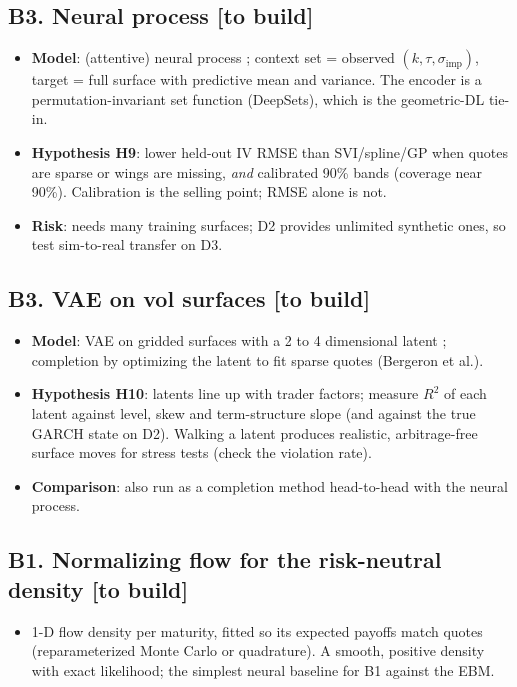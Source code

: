 \documentclass[10pt]{article}
\newcommand{\status}[1]{\textsf{\small[#1]}}
\begin{document}
\subsection{B3. Neural process \status{to build}}
\begin{itemize}
\item \textbf{Model}: (attentive) neural process \cite{np,anp}; context set = observed $(k,\tau,\sigma_{\text{imp}})$,
target = full surface with predictive mean and variance. The encoder is a permutation-invariant set function
(DeepSets), which is the geometric-DL tie-in.
\item \textbf{Hypothesis H9}: lower held-out IV RMSE than SVI/spline/GP when quotes are sparse or wings are missing,
\emph{and} calibrated 90\% bands (coverage near 90\%). Calibration is the selling point; RMSE alone is not.
\item \textbf{Risk}: needs many training surfaces; D2 provides unlimited synthetic ones, so test sim-to-real
transfer on D3.
\end{itemize}

\subsection{B3. VAE on vol surfaces \status{to build}}
\begin{itemize}
\item \textbf{Model}: VAE on gridded surfaces with a 2 to 4 dimensional latent \cite{bergeron,ning}; completion by
optimizing the latent to fit sparse quotes (Bergeron et al.).
\item \textbf{Hypothesis H10}: latents line up with trader factors; measure $R^2$ of each latent against level,
skew and term-structure slope (and against the true GARCH state on D2). Walking a latent produces realistic,
arbitrage-free surface moves for stress tests (check the violation rate).
\item \textbf{Comparison}: also run as a completion method head-to-head with the neural process.
\end{itemize}

\subsection{B1. Normalizing flow for the risk-neutral density \status{to build}}
\begin{itemize}
\item 1-D flow density per maturity, fitted so its expected payoffs match quotes (reparameterized Monte Carlo or
quadrature). A smooth, positive density with exact likelihood; the simplest neural baseline for B1 against the EBM.
\end{itemize}
\end{document}
